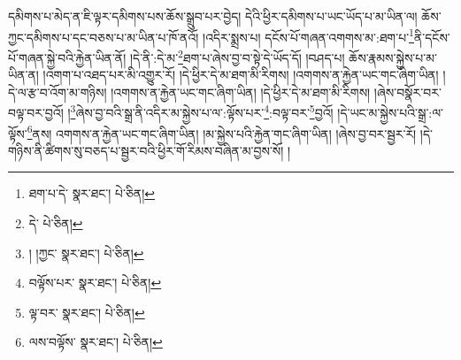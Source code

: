 དམིགས་པ་མེད་ན་ཇི་ལྟར་དམིགས་པས་ཆོས་སྒྲུབ་པར་བྱེད། དེའི་ཕྱིར་དམིགས་པ་ཡང་ཡོད་པ་མ་ཡིན་ལ། ཆོས་ཀྱང་དམིགས་པ་དང་བཅས་པ་མ་ཡིན་པ་ཁོ་ནའོ། །འདིར་སྨྲས་པ། དངོས་པོ་གཞན་འགགས་མ་:ཐག་པ་\footnote{ཐག་པ་དེ་  སྣར་ཐང་།  པེ་ཅིན། }ནི་དངོས་པོ་གཞན་སྐྱེ་བའི་རྐྱེན་ཡིན་ནོ། །དེ་ནི་:དེ་མ་\footnote{དེ་  པེ་ཅིན། }ཐག་པ་ཞེས་བྱ་བ་སྟེ་དེ་ཡོད་དོ། །བཤད་པ། ཆོས་རྣམས་སྐྱེས་པ་མ་ཡིན་ན། །འགག་པ་འཐད་པར་མི་འགྱུར་རོ། །དེ་ཕྱིར་དེ་མ་ཐག་མི་རིགས། །འགགས་ན་རྐྱེན་ཡང་གང་ཞིག་ཡིན། །དེ་ལ་རྩ་བ་འོག་མ་གཉིས། །འགགས་ན་རྐྱེན་ཡང་གང་ཞིག་ཡིན། །དེ་ཕྱིར་དེ་མ་ཐག་མི་རིགས། །ཞེས་བསྣོར་བར་བལྟ་བར་བྱའོ། །\footnote{། །ཀྱང་  སྣར་ཐང་།  པེ་ཅིན། }ཞེས་བྱ་བའི་སྒྲ་ནི་འདིར་མ་སྐྱེས་པ་ལ་:ལྟོས་པར་\footnote{བལྟོས་པར་  སྣར་ཐང་།  པེ་ཅིན། }:བལྟ་བར་\footnote{ལྟ་བར་  སྣར་ཐང་།  པེ་ཅིན། }བྱའོ། །དེ་ཡང་མ་སྐྱེས་པའི་སྒྲ་:ལ་ལྟོས་\footnote{ལས་བལྟོས་  སྣར་ཐང་།  པེ་ཅིན། }ནས། འགགས་ན་རྐྱེན་ཡང་གང་ཞིག་ཡིན། །མ་སྐྱེས་པའི་རྐྱེན་གང་ཞིག་ཡིན། །ཞེས་བྱ་བར་སྦྱར་རོ། །དེ་གཉིས་ནི་ཚིགས་སུ་བཅད་པ་སྦྱར་བའི་ཕྱིར་གོ་རིམས་བཞིན་མ་བྱས་སོ། །
